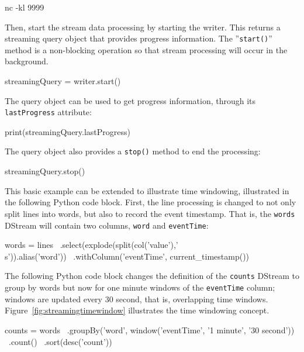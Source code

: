 \begin{bashcode}
nc -kl 9999
\end{bashcode}

Then, start the stream data processing by starting the writer. This returns a streaming query object that provides progress information. The ''\texttt{start()}'' method is a non-blocking operation so that stream processing will occur in the background.

\begin{pythoncode}
streamingQuery = writer.start()
\end{pythoncode}

The query object can be used to get progress information, through its \texttt{lastProgress} attribute:

\begin{pythoncode}
print(streamingQuery.lastProgress)
\end{pythoncode}

The query object also provides a \texttt{stop()} method to end the processing:

\begin{pythoncode}
streamingQuery.stop()
\end{pythoncode}

This basic example can be extended to illustrate time windowing, illustrated in the following Python code block. First, the line processing is changed to not only split lines into words, but also to record the event timestamp. That is, the \texttt{words} DStream will contain two columns, \texttt{word} and \texttt{eventTime}:

\begin{samepage}
\begin{pythoncode}
words = lines \
    .select(explode(split(col('value'),'\\s')).alias('word')) \
    .withColumn('eventTime', current_timestamp())
\end{pythoncode}
\end{samepage}

The following Python code block changes the definition of the \texttt{counts} DStream to group by words but now for one minute windows of the \texttt{eventTime} column; windows are updated every 30 second, that is, overlapping time windows. Figure~\ref{fig:streamingtimewindow} illustrates the time windowing concept.

\begin{samepage}
\begin{pythoncode}
counts = words \
    .groupBy('word', window('eventTime', '1 minute', '30 second')) \
    .count() \
    .sort(desc('count'))
\end{pythoncode}
\end{samepage}

